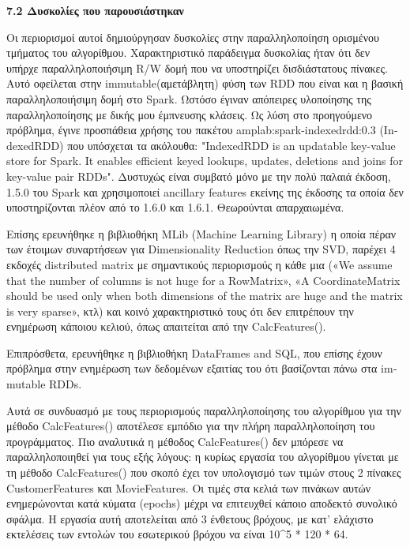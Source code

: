 \documentclass{report}
\begin{document}
{\vspace{20mm} 

\textbf{\large{7.2 Δυσκολίες που παρουσιάστηκαν}}

\vspace{2mm}


Οι περιορισμοί αυτοί δημιούργησαν δυσκολίες στην παραλληλοποίηση ορισμένου τμήματος του αλγορίθμου. Χαρακτηριστικό παράδειγμα δυσκολίας ήταν ότι δεν υπήρχε παραλληλοποιήσιμη \textlatin{R/W} δομή που να υποστηρίζει δισδιάστατους πίνακες. Αυτό οφείλεται στην \textlatin{immutable}(αμετάβλητη) φύση των \textlatin{RDD} που είναι και η βασική παραλληλοποιήσιμη δομή στο \textlatin{Spark}. Ωστόσο έγιναν απόπειρες υλοποίησης της παραλληλοποίησης με δικής μου έμπνευσης κλάσεις.  Ως λύση στο προηγούμενο πρόβλημα, έγινε προσπάθεια χρήσης του πακέτου \textlatin{amplab:spark-indexedrdd:0.3 (IndexedRDD)} που υπόσχεται τα ακόλουθα: "\textlatin{IndexedRDD is an updatable key-value store for Spark. It enables efficient keyed lookups, updates, deletions and joins for key-value pair RDDs}". Δυστυχώς είναι συμβατό μόνο με την πολύ παλαιά έκδοση, 1.5.0 του \textlatin{Spark} και χρησιμοποιεί \textlatin{ancillary features} εκείνης της έκδοσης τα οποία δεν υποστηρίζονται πλέον από το 1.6.0 και 1.6.1. Θεωρούνται απαρχαιωμένα.

Επίσης ερευνήθηκε η βιβλιοθήκη \textlatin{MLib (Machine Learning Library)} η οποία πέραν των έτοιμων συναρτήσεων για \textlatin{Dimensionality Reduction} όπως την \textlatin{SVD}, παρέχει 4 εκδοχές \textlatin{distributed matrix} με σημαντικούς περιορισμούς η κάθε μια («\textlatin{We assume that the number of columns is not huge for a RowMatrix», «A CoordinateMatrix should be used only when both dimensions of the matrix are huge and the matrix is very sparse}», κτλ) και κοινό χαρακτηριστικό τους ότι δεν επιτρέπουν την ενημέρωση κάποιου κελιού, όπως απαιτείται από την \textlatin{CalcFeatures}().

Επιπρόσθετα, ερευνήθηκε η βιβλιοθήκη \textlatin{DataFrames and SQL}, που επίσης έχουν πρόβλημα στην ενημέρωση των δεδομένων εξαιτίας του ότι βασίζονται πάνω στα \textlatin{immutable RDDs}.

Αυτά σε συνδυασμό με τους περιορισμούς παραλληλοποίησης του αλγορίθμου για την μέθοδο \textlatin{CalcFeatures}() αποτέλεσε εμπόδιο για την πλήρη παραλληλοποίηση του προγράμματος. Πιο αναλυτικά η μέθοδος \textlatin{CalcFeatures}() δεν μπόρεσε να παραλληλοποιηθεί για τους εξής λόγους: η κυρίως εργασία του αλγορίθμου γίνεται με τη μέθοδο \textlatin{CalcFeatures}() που σκοπό έχει τον υπολογισμό των τιμών στους 2 πίνακες \textlatin{CustomerFeatures} και \textlatin{MovieFeatures}. Οι τιμές στα κελιά των πινάκων αυτών ενημερώνονται κατά κύματα \textlatin{(epochs)} μέχρι να επιτευχθεί κάποιο αποδεκτό συνολικό σφάλμα. Η εργασία αυτή αποτελείται από 3 ένθετους βρόχους, με κατ’ ελάχιστο εκτελέσεις των εντολών του εσωτερικού βρόχου να είναι 10^5 * 120 * 64. 

}
\end{document}
